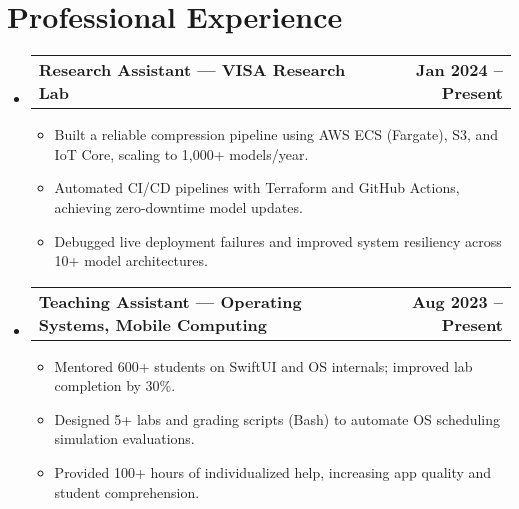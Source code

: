 \documentclass[a4paper, 10pt]{article}
\makeatletter
\newcommand{\resumeExperienceHeading}[2]{
    \item
    \begin{tabular*}{\textwidth}[t]{l@{\extracolsep{\fill}}r}
    \textbf{#1} & \textbf{#2} 
    \end{tabular*}
    \vspace{-15pt}
}
\makeatother
\begin{document}
\section{Professional Experience}
\vspace{-5pt}
\begin{itemize}[leftmargin=0in, label={}]
  \resumeExperienceHeading{Research Assistant — VISA Research Lab}{Jan 2024 – Present}
  \begin{itemize}
    \item Built a reliable compression pipeline using AWS ECS (Fargate), S3, and IoT Core, scaling to 1,000+ models/year.
    \item Automated CI/CD pipelines with Terraform and GitHub Actions, achieving zero-downtime model updates.
    \item Debugged live deployment failures and improved system resiliency across 10+ model architectures.
  \end{itemize}
  \resumeExperienceHeading{Teaching Assistant — Operating Systems, Mobile Computing}{Aug 2023 – Present}
  \begin{itemize}
    \item Mentored 600+ students on SwiftUI and OS internals; improved lab completion by 30\%.
    \item Designed 5+ labs and grading scripts (Bash) to automate OS scheduling simulation evaluations.
    \item Provided 100+ hours of individualized help, increasing app quality and student comprehension.
  \end{itemize}
\end{itemize}

\vspace{-10pt}
\end{document}
